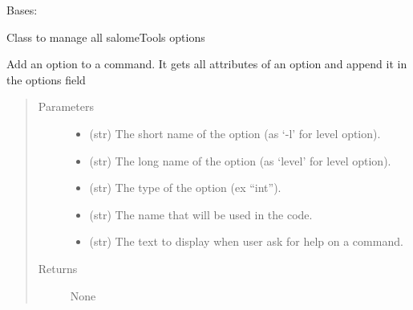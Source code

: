 \documentclass[a4paper,10pt,english]{sphinxmanual}
\begin{document}

\begin{fulllineitems}
\label{\detokenize{apidoc_src/src:src.options.Options}}
Bases: 

Class to manage all salomeTools options

\begin{fulllineitems}
\label{\detokenize{apidoc_src/src:src.options.Options.add_option}}
Add an option to a command. It gets all attributes
of an option and append it in the options field
\begin{quote}\begin{description}
\item[{Parameters}] \leavevmode\begin{itemize}
\item {} 
 \textendash{} (str) 
The short name of the option (as ‘-l’ for level option).

\item {} 
 \textendash{} (str) 
The long name of the option (as ‘\textendash{}level’ for level option).

\item {} 
 \textendash{} (str) The type of the option (ex “int”).

\item {} 
 \textendash{} (str) The name that will be used in the code.

\item {} 
 \textendash{} (str) 
The text to display when user ask for help on a command.

\end{itemize}

\item[{Returns}] \leavevmode
None

\end{description}\end{quote}


\end{fulllineitems}
\end{fulllineitems}
\end{document}
